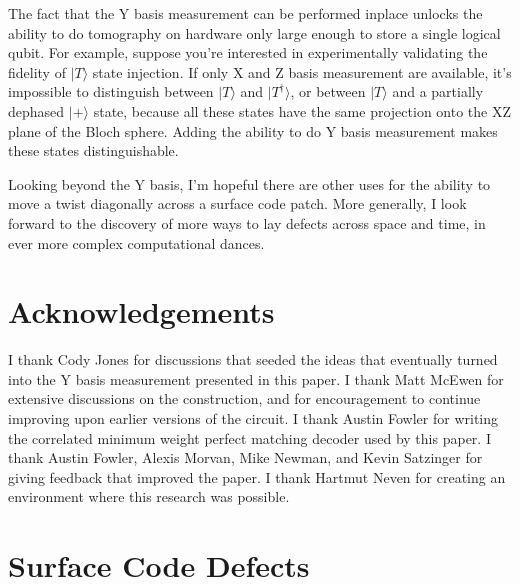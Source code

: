 \documentclass[onecolumn,unpublished,a4paper]{quantumarticle}
\theoremstyle{definition}
\theoremstyle{definition}
\theoremstyle{definition}
\begin{document}
The fact that the Y basis measurement can be performed inplace unlocks the ability to do tomography on hardware only large enough to store a single logical qubit.
For example, suppose you're interested in experimentally validating the fidelity of $|T\rangle$ state injection.
If only X and Z basis measurement are available, it's impossible to distinguish between $|T\rangle$ and $|T^\dagger\rangle$, or between $|T\rangle$ and a partially dephased $|+\rangle$ state, because all these states have the same projection onto the XZ plane of the Bloch sphere.
Adding the ability to do Y basis measurement makes these states distinguishable.

Looking beyond the Y basis, I'm hopeful there are other uses for the ability to move a twist diagonally across a surface code patch.
More generally, I look forward to the discovery of more ways to lay defects across space and time, in ever more complex computational dances.

\section{Acknowledgements}

I thank Cody Jones for discussions that seeded the ideas that eventually turned into the Y basis measurement presented in this paper.
I thank Matt McEwen for extensive discussions on the construction, and for encouragement to continue improving upon earlier versions of the circuit.
I thank Austin Fowler for writing the correlated minimum weight perfect matching decoder used by this paper.
I thank Austin Fowler, Alexis Morvan, Mike Newman, and Kevin Satzinger for giving feedback that improved the paper.
I thank Hartmut Neven for creating an environment where this research was possible.

\printbibliography

\appendix

\section{Surface Code Defects}
\label{app:defects}
\end{document}
